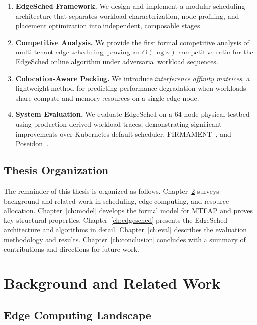 \documentclass[12pt,letterpaper,twoside]{report}
\begin{document}
\begin{enumerate}[leftmargin=*,itemsep=6pt]
    \item \textbf{EdgeSched Framework.} We design and implement a modular scheduling architecture that separates workload characterization, node profiling, and placement optimization into independent, composable stages.

    \item \textbf{Competitive Analysis.} We provide the first formal competitive analysis of multi-tenant edge scheduling, proving an \(O(\log n)\) competitive ratio for the EdgeSched online algorithm under adversarial workload sequences.

    \item \textbf{Colocation-Aware Packing.} We introduce \textit{interference affinity matrices}, a lightweight method for predicting performance degradation when workloads share compute and memory resources on a single edge node.

    \item \textbf{System Evaluation.} We evaluate EdgeSched on a 64-node physical testbed using production-derived workload traces, demonstrating significant improvements over Kubernetes default scheduler, FIRMAMENT~\cite{gog2016}, and Poseidon~\cite{gupta2021}.

\end{enumerate}

\section{Thesis Organization}

The remainder of this thesis is organized as follows. Chapter~\ref{ch:background} surveys background and related work in scheduling, edge computing, and resource allocation. Chapter~\ref{ch:model} develops the formal model for MTEAP and proves key structural properties. Chapter~\ref{ch:edgesched} presents the EdgeSched architecture and algorithms in detail. Chapter~\ref{ch:eval} describes the evaluation methodology and results. Chapter~\ref{ch:conclusion} concludes with a summary of contributions and directions for future work.

\chapter{Background and Related Work}\label{ch:background}

\section{Edge Computing Landscape}
\end{document}
